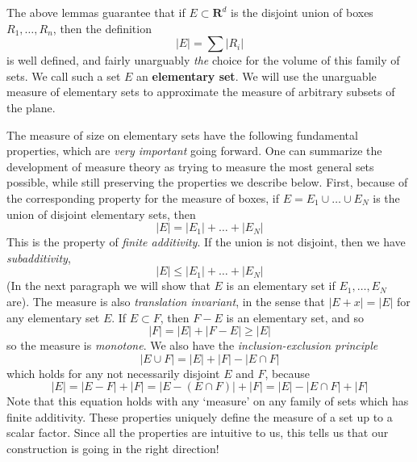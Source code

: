 %


%

The above lemmas guarantee that if $E \subset \mathbf{R}^d$ is the disjoint union of boxes $R_1, \dots, R_n$, then the definition
%
\[ |E| = \sum |R_i| \]
%
is well defined, and fairly unarguably {\it the} choice for the volume of this family of sets. We call such a set $E$ an {\bf elementary set}. We will use the unarguable measure of elementary sets to approximate the measure of arbitrary subsets of the plane.

The measure of size on elementary sets have the following fundamental properties, which are {\it very important} going forward. One can summarize the development of measure theory as trying to measure the most general sets possible, while still preserving the properties we describe below. First, because of the corresponding property for the measure of boxes, if $E = E_1 \cup \dots \cup E_N$ is the union of disjoint elementary sets, then
%
\[ |E| = |E_1| + \dots + |E_N| \]
%
This is the property of {\it finite additivity}. If the union is not disjoint, then we have {\it subadditivity},
%
\[ |E| \leq |E_1| + \dots + |E_N| \]
%
(In the next paragraph we will show that $E$ is an elementary set if $E_1, \dots, E_N$ are). The measure is also {\it translation invariant}, in the sense that $|E + x| = |E|$ for any elementary set $E$. If $E \subset F$, then $F - E$ is an elementary set, and so
%
\[ |F| = |E| + |F - E| \geq |E| \]
%
so the measure is {\it monotone}. We also have the {\it inclusion-exclusion principle}
%
\[ |E \cup F| = |E| + |F| - |E \cap F| \]
%
which holds for any not necessarily disjoint $E$ and $F$, because
%
\[ |E| = |E - F| + |F| = |E - (E \cap F)| + |F| = |E| - |E \cap F| + |F| \]
%
Note that this equation holds with any `measure' on any family of sets which has finite additivity. These properties uniquely define the measure of a set up to a scalar factor. Since all the properties are intuitive to us, this tells us that our construction is going in the right direction!

